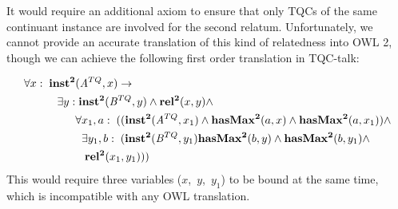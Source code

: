 It would require an additional axiom to ensure that only TQCs of the same continuant instance are involved
for the second relatum. Unfortunately, we cannot provide an
accurate translation of this kind of relatedness into OWL 2, though we can
achieve the following first order translation in TQC-talk:

 \begin{equation}
\begin{split}
\forall x:\; \mathrm{\mathbf{inst^2}}&(\mathit{A}^{TQ},x) \rightarrow \\
 \exists y:&\;\mathrm{\mathbf{inst^2}}(\mathit{B}^{TQ},y) \wedge \mathrm{\mathbf{rel^2}}(x,y)\wedge\\
 & \forall x_1,a:\; ((\mathrm{\mathbf{inst^2}}(\mathit{A}^{TQ},x_1) \wedge
\mathrm{\mathbf{hasMax^2}}(a,x) \wedge \mathrm{\mathbf{hasMax^2}}(a,x_1))\wedge\\
&\;\;\exists y_1,b:\;(\mathrm{\mathbf{inst^2}}(\mathit{B}^{TQ},y_1) \mathrm{\mathbf{hasMax^2}}(b,y)  
\wedge \mathrm{\mathbf{hasMax^2}}(b,y_1) \wedge\\&\;\;\;\mathrm{\mathbf{rel^2}}(x_1,y_1)))
\end{split}
\end{equation}
This would require three variables ($x$,~$y$,~$y_1$) to be bound at the same
time, which is incompatible with any OWL translation.

